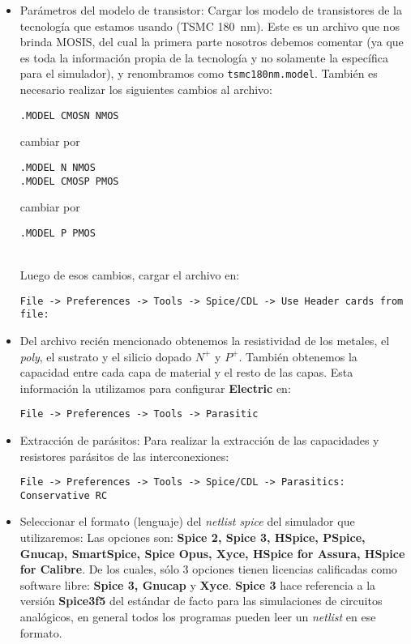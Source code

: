 \begin{itemize}
\item Parámetros del modelo de transistor: Cargar los modelo de transistores de la tecnología que estamos usando (TSMC 180~nm). Este es un archivo que nos brinda MOSIS, del cual la primera parte nosotros debemos comentar (ya que es toda la información propia de la tecnología y no solamente la específica para el simulador), y renombramos como {\footnotesize\verb#tsmc180nm.model#}. También es necesario realizar los siguientes cambios al archivo:\\
\begin{footnotesize}\verb#.MODEL CMOSN NMOS#\end{footnotesize} cambiar por \begin{footnotesize}\verb#.MODEL N NMOS# \\
\verb#.MODEL CMOSP PMOS#\end{footnotesize} cambiar por \begin{footnotesize}\verb#.MODEL P PMOS# \end{footnotesize} \\
Luego de esos cambios, cargar el archivo en:\\
\begin{footnotesize}\verb.File -> Preferences -> Tools -> Spice/CDL -> Use Header cards from file:.\end{footnotesize}
	\item Del archivo recién mencionado obtenemos la resistividad de los metales, el \emph{poly}, el sustrato y el silicio dopado $N^+$ y $P^+$. También obtenemos la capacidad entre cada capa de material y el resto de las capas. Esta información la utilizamos para configurar \textbf{Electric} en: \\
\begin{footnotesize}\verb.File -> Preferences -> Tools -> Parasitic. \end{footnotesize}
\item Extracción de parásitos: Para realizar la extracción de las capacidades y resistores parásitos de las interconexiones: \\
\begin{footnotesize}\verb.File -> Preferences -> Tools -> Spice/CDL -> Parasitics: Conservative RC. \end{footnotesize}
\item Seleccionar el formato (lenguaje) del \emph{netlist spice} del simulador que utilizaremos: Las opciones son: \textbf{Spice 2, Spice 3, HSpice, PSpice, Gnucap, SmartSpice,  Spice Opus, Xyce, HSpice for Assura, HSpice for Calibre}. De los cuales, sólo 3 opciones tienen licencias calificadas como software libre: \textbf{Spice 3, Gnucap} y \textbf{Xyce}. \textbf{Spice 3} hace referencia a la versión \textbf{Spice3f5} del estándar de facto para las simulaciones de circuitos analógicos, en general todos los programas pueden leer un \emph{netlist} en ese formato.
\end{itemize}


